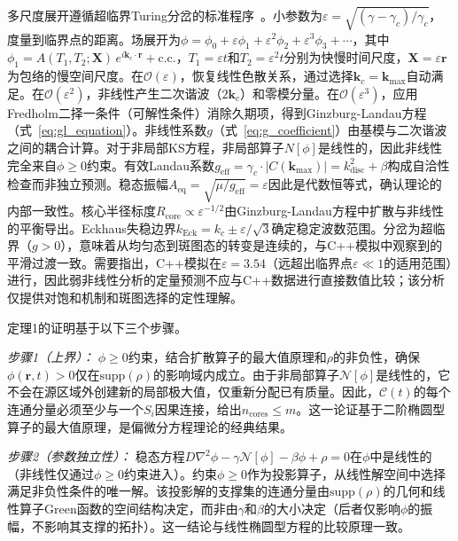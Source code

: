 \documentclass[sn-nature,pdflatex]{sn-jnl}
\begin{document}
多尺度展开遵循超临界Turing分岔的标准程序~\cite{aranson_kramer_2002}。小参数为$\varepsilon = \sqrt{(\gamma - \gamma_c)/\gamma_c}$，度量到临界点的距离。场展开为$\phi = \phi_0 + \varepsilon\phi_1 + \varepsilon^2\phi_2 + \varepsilon^3\phi_3 + \cdots$，其中$\phi_1 = A(T_1, T_2; \mathbf{X})\,e^{i\mathbf{k}_c\cdot\mathbf{r}} + \text{c.c.}$，$T_1 = \varepsilon t$和$T_2 = \varepsilon^2 t$分别为快慢时间尺度，$\mathbf{X} = \varepsilon\mathbf{r}$为包络的慢空间尺度。在$\mathcal{O}(\varepsilon)$，恢复线性色散关系，通过选择$\mathbf{k}_c = \mathbf{k}_{\max}$自动满足。在$\mathcal{O}(\varepsilon^2)$，非线性产生二次谐波（$2\mathbf{k}_c$）和零模分量。在$\mathcal{O}(\varepsilon^3)$，应用Fredholm二择一条件（可解性条件）消除久期项，得到Ginzburg-Landau方程（式~\ref{eq:gl_equation}）。非线性系数$g$（式~\ref{eq:g_coefficient}）由基模与二次谐波之间的耦合计算。对于非局部KS方程，非局部算子$N[\phi]$是线性的，因此非线性完全来自$\phi \ge 0$约束。有效Landau系数$g_{\text{eff}} = \gamma_c \cdot |C(\mathbf{k}_{\max})| = k^2_{\text{disc}} + \beta$构成自洽性检查而非独立预测。稳态振幅$A_{\text{eq}} = \sqrt{\mu/g_{\text{eff}}} = \varepsilon$因此是代数恒等式，确认理论的内部一致性。核心半径标度$R_{\text{core}} \propto \varepsilon^{-1/2}$由Ginzburg-Landau方程中扩散与非线性的平衡导出。Eckhaus失稳边界$k_{\text{Eck}} = k_c \pm \varepsilon/\sqrt{3}$确定稳定波数范围。分岔为超临界（$g > 0$），意味着从均匀态到斑图态的转变是连续的，与C++模拟中观察到的平滑过渡一致。需要指出，C++模拟在$\varepsilon = 3.54$（远超出临界点$\varepsilon \ll 1$的适用范围）进行，因此弱非线性分析的定量预测不应与C++数据进行直接数值比较；该分析仅提供对饱和机制和斑图选择的定性理解。

定理1的证明基于以下三个步骤。

\textit{步骤1（上界）：} $\phi \ge 0$约束，结合扩散算子的最大值原理和$\rho$的非负性，确保$\phi(\mathbf{r}, t) > 0$仅在$\text{supp}(\rho)$的影响域内成立。由于非局部算子$\mathcal{N}[\phi]$是线性的，它不会在源区域外创建新的局部极大值，仅重新分配已有质量。因此，$\mathcal{C}(t)$的每个连通分量必须至少与一个$S_i$因果连接，给出$n_{\text{cores}} \le m$。这一论证基于二阶椭圆型算子的最大值原理，是偏微分方程理论的经典结果。

\textit{步骤2（参数独立性）：} 稳态方程$D\nabla^2\phi - \gamma\mathcal{N}[\phi] - \beta\phi + \rho = 0$在$\phi$中是线性的（非线性仅通过$\phi \ge 0$约束进入）。约束$\phi \ge 0$作为投影算子，从线性解空间中选择满足非负性条件的唯一解。该投影解的支撑集的连通分量由$\text{supp}(\rho)$的几何和线性算子Green函数的空间结构决定，而非由$\gamma$和$\beta$的大小决定（后者仅影响$\phi$的振幅，不影响其支撑的拓扑）。这一结论与线性椭圆型方程的比较原理一致。
\end{document}
